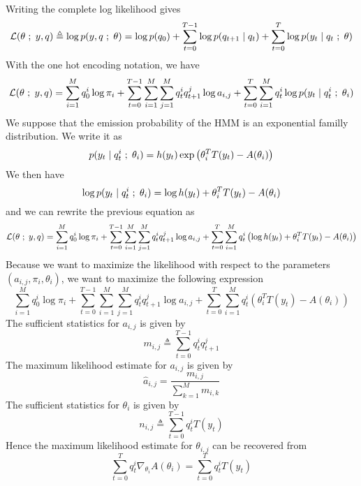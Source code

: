 \documentclass[a4paper, 11pt]{article}
\newcommand{\grad}{\nabla}
\newcommand{\eqdef}{\triangleq}
\newcommand{\ssemi}{\hspace{.3em};\hspace{.3em}}
\begin{document}
Writing the complete log likelihood gives
\begin{displaymath}
  \mathcal{L}(\theta \ssemi y, q) \eqdef \log{p(y, q \ssemi \theta)} = \log{p(q_0)} + \sum_{t = 0}^{T-1} \log{p(q_{t+1} \mid q_t)} + \sum_{t = 0}^{T} \log{ p(y_t \mid q_t \ssemi \theta) }
\end{displaymath}
With the one hot encoding notation, we have
\begin{displaymath}
  \mathcal{L}(\theta \ssemi y, q)
  = \sum_{i = 1}^{M} q_0^i \log{\pi_i}
  + \sum_{t = 0}^{T-1} \sum_{i = 1}^{M} \sum_{j = 1}^{M} q_t^i q_{t+1}^j \log{a_{i,j}}
  + \sum_{t = 0}^{T} \sum_{i = 1}^{M} q_t^i \log{ p(y_t \mid q_t^i \ssemi \theta_i) }
\end{displaymath}
We suppose that the emission probability of the HMM is an exponential
familly distribution. We write it as
\begin{displaymath}
  \label{exp-form}
  p(y_t \mid q_t^i \ssemi \theta_i) = h(y_t) \exp{\left(\theta_i^T T(y_t) - A(\theta_i)\right)}
\end{displaymath}
We then have
\begin{displaymath}
  \label{log-exp-form}
  \log{ p(y_t \mid q_t^i \ssemi \theta_i) } = \log{h(y_t)} + \theta_i^T T(y_t) - A(\theta_i)
\end{displaymath}
and we can rewrite the previous equation as
\begin{displaymath}
  \mathcal{L}(\theta \ssemi y, q)
  = \sum_{i = 1}^{M} q_0^i \log{\pi_i}
  + \sum_{t = 0}^{T-1} \sum_{i = 1}^{M} \sum_{j = 1}^{M} q_t^i q_{t+1}^j \log{a_{i,j}}
  + \sum_{t = 0}^{T} \sum_{i = 1}^{M} q_t^i \left( \log{h(y_t)} + \theta_i^T T(y_t) - A(\theta_i)\right)
\end{displaymath}
Because we want to maximize the likelihood with respect to the
parameters $(a_{i,j}, \pi_i, \theta_i)$, we want to maximize the
following expression
\begin{displaymath}
  \sum_{i = 1}^{M} q_0^i \log{\pi_i}
  + \sum_{t = 0}^{T-1} \sum_{i = 1}^{M} \sum_{j = 1}^{M} q_t^i q_{t+1}^j \log{a_{i,j}}
  + \sum_{t = 0}^{T} \sum_{i = 1}^{M} q_t^i \left(\theta_i^T T(y_t) - A(\theta_i)\right)
\end{displaymath}
The sufficient statistics for $a_{i,j}$ is given by
\begin{displaymath}
  m_{i, j} \eqdef \sum_{t = 0}^{T-1} q_t^i q_{t+1}^j
\end{displaymath}
The maximum likelihood estimate for $a_{i, j}$ is given by
\begin{displaymath}
  \hat{a}_{i,j} = \dfrac{
    m_{i,j}
  }{
    \sum_{k = 1}^M m_{i, k}
  }
\end{displaymath}
The sufficient statistics for $\theta_{i}$ is given by
\begin{displaymath}
  n_{i, j} \eqdef \sum_{t = 0}^{T-1} q_t^i T(y_t)
\end{displaymath}
Hence the maximum likelihood estimate for $\theta_{i, j}$ can be
recovered from
\begin{displaymath}
  \sum_{t = 0}^T q_t^i \grad_{\theta_i}A(\theta_i) = \sum_{t = 0}^T q_t^i T(y_t)
\end{displaymath}
\end{document}

